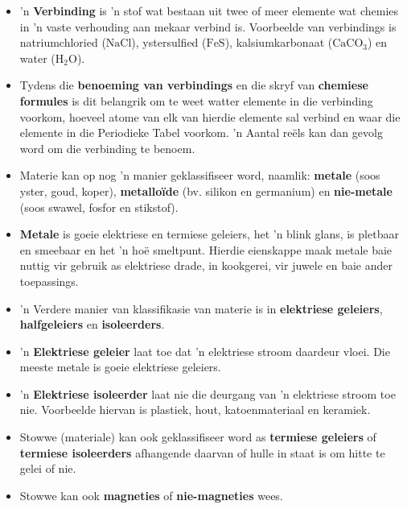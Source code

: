 \begin{itemize}[noitemsep]
     \item 'n \textbf{Verbinding} is 'n stof wat bestaan uit twee of meer elemente wat chemies
in 'n vaste verhouding aan mekaar verbind is. Voorbeelde van verbindings is natriumchloried ($\text{NaCl}$),
ystersulfied ($\text{FeS}$), kalsiumkarbonaat (${\text{CaCO}}_{3}$) en water (${\text{H}}_{2}\text{O}$).
     \item Tydens die \textbf{benoeming van verbindings} en die skryf van \textbf{chemiese formules} is dit belangrik om  te weet watter elemente in die verbinding voorkom, hoeveel atome van elk van hierdie elemente sal verbind en waar die elemente in die Periodieke Tabel voorkom. 'n Aantal re\"els kan dan gevolg word om die verbinding te benoem.
     \item Materie kan op nog 'n manier geklassifiseer word, naamlik: \textbf{metale} (soos yster, goud, koper), \textbf{metallo\"ide} (bv. silikon en germanium) en \textbf{nie-metale} (soos swawel, fosfor en stikstof).
     \item \textbf{Metale} is goeie elektriese en termiese geleiers, het 'n blink glans, is pletbaar en smeebaar en het 'n ho\"e smeltpunt. Hierdie eienskappe maak metale baie nuttig vir gebruik as elektriese drade, in kookgerei, vir juwele en baie ander toepassings.
     \item 'n Verdere manier van klassifikasie van materie is in \textbf{elektriese geleiers}, \textbf{halfgeleiers} en \textbf{isoleerders}.
     \item 'n \textbf{Elektriese geleier} laat toe dat 'n elektriese stroom daardeur vloei. Die meeste metale is goeie elektriese geleiers.
     \item 'n \textbf{Elektriese isoleerder} laat nie die deurgang van 'n elektriese stroom toe nie. Voorbeelde hiervan is plastiek, hout, katoenmateriaal en keramiek.
     \item Stowwe (materiale) kan ook geklassifiseer word as \textbf{termiese geleiers} of \textbf{termiese isoleerders} afhangende daarvan of hulle in staat is om hitte te gelei of nie.
     \item Stowwe kan ook \textbf{magneties} of \textbf{nie-magneties} wees.
\end{itemize} \pagebreak

\label{m38706*secfhsst!!!underscore!!!id672}

